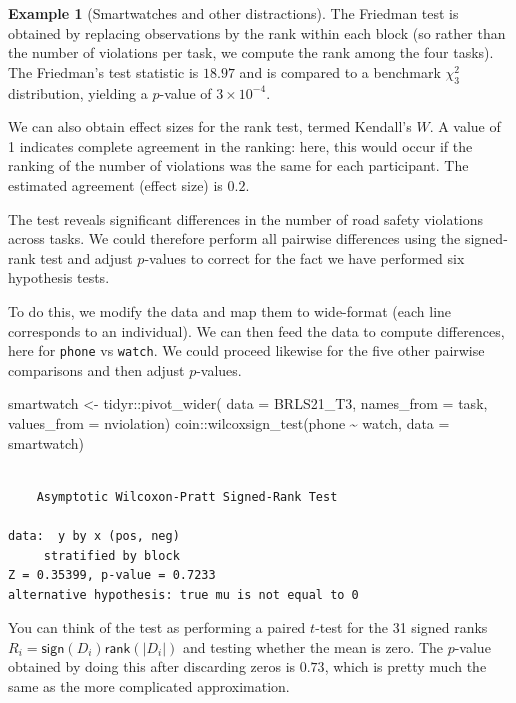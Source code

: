 \documentclass[
  11pt,
  letterpaper,
]{scrbook}
\newenvironment{Shaded}{\begin{snugshade}}{\end{snugshade}}
\newcommand{\AttributeTok}[1]{\textcolor[rgb]{0.40,0.45,0.13}{#1}}
\newcommand{\FunctionTok}[1]{\textcolor[rgb]{0.28,0.35,0.67}{#1}}
\newcommand{\NormalTok}[1]{\textcolor[rgb]{0.00,0.23,0.31}{#1}}
\newcommand{\OtherTok}[1]{\textcolor[rgb]{0.00,0.23,0.31}{#1}}
\newcommand{\SpecialCharTok}[1]{\textcolor[rgb]{0.37,0.37,0.37}{#1}}
\theoremstyle{definition}
\newtheorem{example}{Example}[chapter]
\theoremstyle{remark}
\begin{document}
\begin{example}[Smartwatches and other
distractions]
The Friedman test is obtained by replacing observations by the rank
within each block (so rather than the number of violations per task, we
compute the rank among the four tasks). The Friedman's test statistic is
\(18.97\) and is compared to a benchmark \(\chi^2_3\) distribution,
yielding a \(p\)-value of \(\ensuremath{3\times 10^{-4}}\).

We can also obtain effect sizes for the rank test, termed Kendall's
\(W\). A value of 1 indicates complete agreement in the ranking: here,
this would occur if the ranking of the number of violations was the same
for each participant. The estimated agreement (effect size) is \(0.2\).

The test reveals significant differences in the number of road safety
violations across tasks. We could therefore perform all pairwise
differences using the signed-rank test and adjust \(p\)-values to
correct for the fact we have performed six hypothesis tests.

To do this, we modify the data and map them to wide-format (each line
corresponds to an individual). We can then feed the data to compute
differences, here for \texttt{phone} vs \texttt{watch}. We could proceed
likewise for the five other pairwise comparisons and then adjust
\(p\)-values.

\begin{Shaded}
\begin{Highlighting}[]
\NormalTok{smartwatch }\OtherTok{\textless{}{-}}\NormalTok{ tidyr}\SpecialCharTok{::}\FunctionTok{pivot\_wider}\NormalTok{(}
  \AttributeTok{data =}\NormalTok{ BRLS21\_T3,}
  \AttributeTok{names\_from =}\NormalTok{ task,}
  \AttributeTok{values\_from =}\NormalTok{ nviolation)}
\NormalTok{coin}\SpecialCharTok{::}\FunctionTok{wilcoxsign\_test}\NormalTok{(phone }\SpecialCharTok{\textasciitilde{}}\NormalTok{ watch,}
                      \AttributeTok{data =}\NormalTok{ smartwatch)}
\end{Highlighting}
\end{Shaded}

\begin{verbatim}

    Asymptotic Wilcoxon-Pratt Signed-Rank Test

data:  y by x (pos, neg) 
     stratified by block
Z = 0.35399, p-value = 0.7233
alternative hypothesis: true mu is not equal to 0
\end{verbatim}

You can think of the test as performing a paired \(t\)-test for the 31
signed ranks \(R_i =\mathsf{sign}(D_i) \mathsf{rank}(|D_i|)\) and
testing whether the mean is zero. The \(p\)-value obtained by doing this
after discarding zeros is \(0.73\), which is pretty much the same as the
more complicated approximation.

\end{example}
\end{document}
